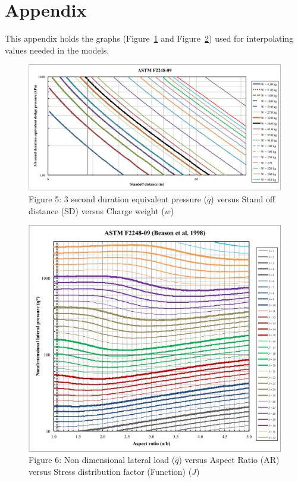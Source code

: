 \documentclass[12pt]{article}
\begin{document}
\section{Appendix}
\label{Sec:Appendix}
This appendix holds the graphs (Figure~\ref{Figure:demandVSsod} and Figure~\ref{Figure:dimlessloadVSaspect}) used for interpolating values needed in the models.
\begin{figure}
\begin{center}
\includegraphics[width=\textwidth]{../../../datafiles/GlassBR/ASTM_F2248-09.png}
\caption{Figure 5: 3 second duration equivalent pressure ($q$) versus Stand off distance (SD) versus Charge weight ($w$)}
\label{Figure:demandVSsod}
\end{center}
\end{figure}
\begin{figure}
\begin{center}
\includegraphics[width=\textwidth]{../../../datafiles/GlassBR/ASTM_F2248-09_BeasonEtAl.png}
\caption{Figure 6: Non dimensional lateral load ($\hat{q}$) versus Aspect Ratio (AR) versus Stress distribution factor (Function) ($J$)}
\label{Figure:dimlessloadVSaspect}
\end{center}
\end{figure}
\end{document}
